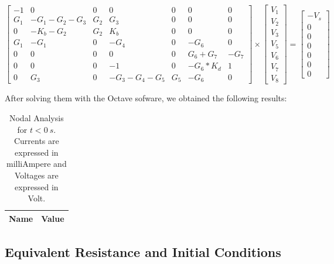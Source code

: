 \begin{equation}
\begin{bmatrix}
	-1	&	0	&	0	&	0	&	0	&	0	&	0 \\
	G_1	&	-G_1 - G_2 - G_3	&	G_2	&	G_3	&	0	&	0	&	0 \\
	0	&	-K_b - G_2	&	G_2	&	K_b	&	0	&	0	&	0 \\
	G_1	&	-G_1	&	0	&	-G_4	&	0	&	-G_6	&	0 \\
	0	&	0	&	0	&	0	&	0	&	G_6 + G_7	&	-G_7 \\
	0	&	0	&	0	&	-1	&	0	&	-G_6 *	K_d	&	1 \\
	0	&	G_3	&	0	&	-G_3 - G_4 - G_5	&	G_5	&	-G_6	&	0
\end{bmatrix}
\times
\begin{bmatrix}
	V_1 \\
	V_2 \\
	V_3 \\
	V_5 \\
	V_6 \\
	V_7 \\
	V_8
\end{bmatrix}
=
\begin{bmatrix}
	-V_s \\
	0 \\
	0 \\
	0 \\
	0 \\
	0 \\
	0
	\label{m:1}
\end{bmatrix}
\end{equation}

After solving them with the Octave sofware, we obtained the following results:



\begin{table}[h]
  \centering
  \begin{tabular}{|l|r|}
    \hline
    {\bf Name} & {\bf Value} \\ \hline
    
  \end{tabular}
  \caption{Nodal Analysis for $t<0~s$. Currents are expressed in milliAmpere and Voltages are expressed in Volt.}                                                            
  \label{tab:theoretical1}                                                      
\end{table}   



\subsection{Equivalent Resistance and Initial Conditions}


